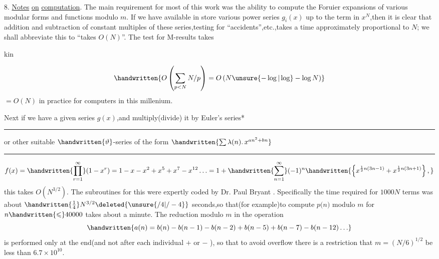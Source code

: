 8. \uline{Notes} \uline{on} \uline{computation}. The main requirement for most of this work was the ability to compute the Foruier expansions of various modular forms and functions modulo \uline{$m$}. If we have available in store various power series $g_{i}(x)$ up to the term in $x^{N}$,then it is clear that addition and subtraction of constant multiples of these series,testing for ``accidents'',etc.,takes a time approximately proportional to $N$; we shall abbreviate this to ``takes $O(N)$''. The test for M-results takes
\normalmarginpar
\begin{flushright}
kin 
\end{flushright}

\[
\handwritten{O\left(\sum_{p<N}N/p\right)=O\left(N\unsure{-\log|\log}-\log N\right)}
\]
$=O(N)$ in practice for computers in this millenium.

Next if we have a given series $g(x)$,and multiply(divide) it by Euler's series*

\noindent\rule{\linewidth}{0.3pt}\par
\noindent *or other suitable $\handwritten{\vartheta}$-series of the form $\handwritten{\sum\lambda(n)\ldotp x^{an^{2}+bn}}$
\par\noindent\rule{\linewidth}{0.3pt}
{\small
\[
f(x)=\handwritten{\prod_{r=1}^{\infty}}(1-x^{r})=1-x-x^{2}+x^{5}+x^{7}-x^{12}\ldots=1+\handwritten{\sum_{n=1}^{\infty}}(-1)^{n}\handwritten{\left\{x^{\frac12 n(3n-1)}+x^{\frac12 n(3n+1)}\right\},}
\]
}
this takes $O(N^{3/2})$. The subroutines for this were expertly coded by Dr. Paul Bryant . Specifically the time required for $1000N$ terms was about $\handwritten{\frac14}N^{3/2}\deleted{\unsure{/4|/-4}}$\reversemarginpar{} seconds,so that(for example)to compute \uline{$p(n$}$)$ modulo \uline{$m$} for $n\handwritten{\leqslant}40000$ takes about a minute. The reduction modulo $m$ in the operation
\[
\handwritten{a(n)=b(n)-b(n-1)-b(n-2)+b(n-5)+b(n-7)-b(n-12)\ldots}
\]
is performed only at the end(and not after each individual $+$ or $-$ ), so that to avoid overflow there is a restriction that $m=(N/6)^{1/2}$ be less than $6.7\times10^{10}$.

